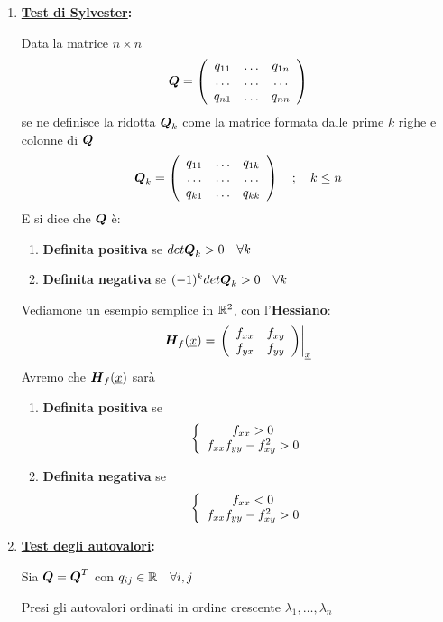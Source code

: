 \begin{enumerate}
	\item \textbf{\underline{Test di Sylvester}:}
	
	Data la matrice $n \times n$ 
	\begin{align}
		\genericOp=\matrixThreeThree{q_{11}}{\dots}{q_{1n}}{\dots}{\dots}{\dots}{q_{n1}}{\dots}{q_{nn}}
	\end{align}
	se ne definisce la ridotta $\boldsymbol{Q}_k$ come  la matrice formata dalle prime $k$ righe e colonne di $\boldsymbol{Q}$
	\begin{align}
		\genericOp_k=\matrixThreeThree{q_{11}}{\dots}{q_{1k}}{\dots}{\dots}{\dots}{q_{k1}}{\dots}{q_{kk}} \spacer k\leq n
	\end{align}
	E si dice che $\boldsymbol{Q}$ è:
	\begin{enumerate}
		\item \textbf{Definita positiva} se $det\boldsymbol{Q}_k >0 \quad \forall k$
		\item \textbf{Definita negativa} se $(-1)^kdet\boldsymbol{Q}_k >0 \quad \forall k$
	\end{enumerate}
	Vediamone un esempio semplice in $\mathbb{R}^2$, con l'\textbf{Hessiano}:
	\begin{align}
		\boldsymbol{H}_{f} (\underline{x})= \left.\left( \begin{array}{ccc} f_{xx} & f_{xy} \\ f_{yx} & f_{yy} \end{array} \right)\right|_{\underline{x}}
	\end{align}
	Avremo che $\boldsymbol{H}_{f} (\underline{x})$ sarà
	\begin{enumerate}
		\item \textbf{Definita positiva} se
		\begin{align}
			\left\{\begin{array}{cc} f_{xx}>0 \\ f_{xx}f_{yy}-f^2_{xy}>0 \end{array}\right.
		\end{align}
		\item \textbf{Definita negativa} se
		\begin{align}
			\left\{\begin{array}{cc} f_{xx}<0 \\ f_{xx}f_{yy}-f^2_{xy}>0 \end{array}\right.
		\end{align}
	\end{enumerate}
	
	\item \textbf{\underline{Test degli autovalori}:}
	
	Sia $\boldsymbol{Q} = \boldsymbol{Q}^T$ con $q_{ij}\in \mathbb{R} \quad \forall i,j$  
	
	Presi gli autovalori ordinati in ordine crescente $\lambda_1, \dots,\lambda_n$
	

\end{enumerate}

